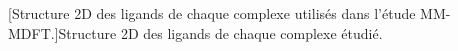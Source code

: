 \begin{center}
    \captionsetup{type=figure}
	[Structure 2D des ligands de chaque complexe utilisés dans l'étude MM-MDFT.]{Structure 2D des ligands de chaque complexe étudié.}
    \label{fig:structures_MMPBSA}
\end{center}


